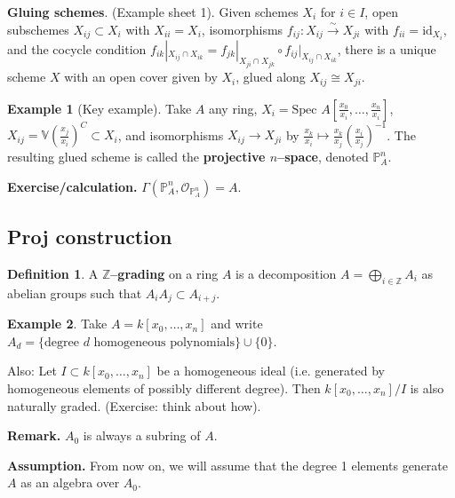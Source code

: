 \documentclass{article}
\theoremstyle{definition}
\newtheorem{example}{Example}[section]
\newtheorem{defn}{Definition}[section]
\begin{document}
\textbf{Gluing schemes}. (Example sheet 1). Given schemes $X_i$ for $i \in I$, open subschemes $X_{ij} \subset X_i$ with $X_{ii} = X_i$, isomorphisms $f_{ij}: X_{ij} \stackrel{\sim}{\to} X_{ji}$ with $f_{ii} = \text{id}_{X_i}$, and the cocycle condition $f_{ik}|_{X_{ij} \cap X_{ik}} = f_{jk}|_{X_{ji} \cap X_{jk}} \circ f_{ij}|_{X_{ij} \cap X_{ik}}$, there is a unique scheme $X$ with an open cover given by $X_i$, glued along $X_{ij} \cong X_{ji}$.

\begin{example}[Key example]
    Take $A$ any ring, $X_i = \text{Spec }A\left[\frac{x_0}{x_i},\ldots,\frac{x_n}{x_i}\right]$, $X_{ij} = \mathbb{V}\left(\frac{x_j}{x_i}\right)^C \subset X_i$, and isomorphisms $X_{ij} \to X_{ji}$ by $\frac{x_k}{x_i}\mapsto \frac{x_k}{x_j}\left(\frac{x_i}{x_j}\right)^{-1}$. The resulting glued scheme is called the \textbf{projective $n$--space}, denoted $\mathbb{P}_A^n$.
\end{example}
\textbf{Exercise/calculation.} $\Gamma(\mathbb{P}_A^n, \mathcal{O}_{\mathbb{P}_A^n}) = A$.

\subsection{Proj construction}
\begin{defn}
    A \textbf{$\mathbb{Z}$--grading} on a ring $A$ is a decomposition $A = \bigoplus_{i \in \mathbb{Z}}A_i$ as abelian groups such that $A_i A_j \subset A_{i+j}$.
\end{defn}
\begin{example}
    Take $A = k[x_0,\ldots,x_n]$ and write $A_d = \{\text{degree }d \text{ homogeneous polynomials}\} \cup \{0\}$.
    \vspace{1mm}
     
    Also: Let $I \subset k[x_0,\ldots,x_n]$ be a homogeneous ideal (i.e. generated by homogeneous elements of possibly different degree). Then $k[x_0,\ldots,x_n]/I$ is also naturally graded. (Exercise: think about how).
\end{example}
\textbf{Remark.} $A_0$ is always a subring of $A$.
\vspace{1mm}
 
\textbf{Assumption.} From now on, we will assume that the degree 1 elements generate $A$ as an algebra over $A_0$.


\vspace{1mm}
 
\end{document}
